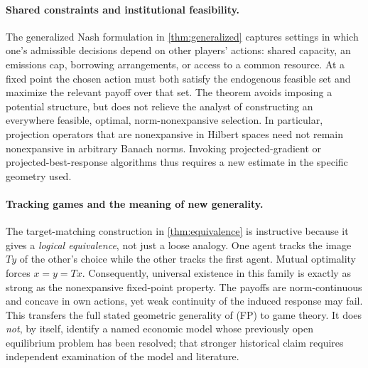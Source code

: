\documentclass[11pt]{article}
\theoremstyle{definition}\newtheorem{definition}[theorem]{Definition}
\begin{document}
\paragraph{Shared constraints and institutional feasibility.}
The generalized Nash formulation in \cref{thm:generalized} captures settings in which one's admissible decisions depend on other players' actions: shared capacity, an emissions cap, borrowing arrangements, or access to a common resource. At a fixed point the chosen action must both satisfy the endogenous feasible set and maximize the relevant payoff over that set. The theorem avoids imposing a potential structure, but does not relieve the analyst of constructing an everywhere feasible, optimal, norm-nonexpansive selection. In particular, projection operators that are nonexpansive in Hilbert spaces need not remain nonexpansive in arbitrary Banach norms. Invoking projected-gradient or projected-best-response algorithms thus requires a new estimate in the specific geometry used.

\paragraph{Tracking games and the meaning of new generality.}
The target-matching construction in \cref{thm:equivalence} is instructive because it gives a \emph{logical equivalence}, not just a loose analogy. One agent tracks the image $Ty$ of the other's choice while the other tracks the first agent. Mutual optimality forces $x=y=Tx$. Consequently, universal existence in this family is exactly as strong as the nonexpansive fixed-point property. The payoffs are norm-continuous and concave in own actions, yet weak continuity of the induced response may fail. This transfers the full stated geometric generality of (FP) to game theory. It does \emph{not}, by itself, identify a named economic model whose previously open equilibrium problem has been resolved; that stronger historical claim requires independent examination of the model and literature.
\end{document}
